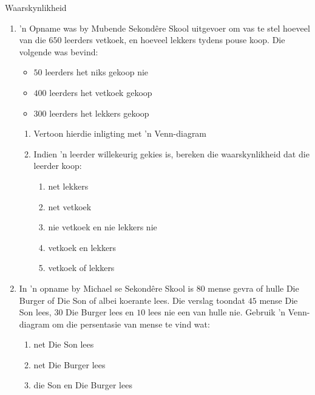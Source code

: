 \begin{eocexercises}{Waarskynlikheid}
\begin{enumerate}[itemsep=5pt, label=\textbf{\arabic*}.]
  \item 'n Opname was by Mubende Sekondêre Skool uitgevoer om vas te stel hoeveel van die $ 650 $ leerders vetkoek, en hoeveel lekkers tydens pouse koop. Die volgende was bevind:
\begin{itemize}
 \item $50$ leerders het niks gekoop nie
\item $400$ leerders het vetkoek gekoop
\item $300$ leerders het lekkers gekoop
\end{itemize}
\begin{enumerate}[noitemsep, label=\textbf{(\alph*)} ]
 \item Vertoon hierdie inligting met 'n Venn-diagram
\item Indien 'n leerder willekeurig gekies is, bereken die waarskynlikheid dat die leerder koop:
\begin{enumerate}[noitemsep, label=\roman*. ]
 \item net lekkers
\item net vetkoek
\item nie vetkoek en nie lekkers nie
\item vetkoek en lekkers
\item vetkoek of lekkers
\end{enumerate}
\end{enumerate}
\item In 'n opname by Michael se Sekondêre Skool is $80$ mense gevra of hulle Die Burger of Die Son of albei koerante lees. Die verslag toondat $45$ mense Die Son lees, $30$ Die Burger lees en $10$ lees nie een van hulle nie. Gebruik 'n Venn-diagram om die persentasie van mense te vind wat:
\begin{enumerate}[noitemsep, label=\textbf{(\alph*)} ]
 \item net Die Son lees
\item net Die Burger lees
\item die Son en Die Burger lees
\end{enumerate}

  \end{enumerate}

\end{eocexercises}
